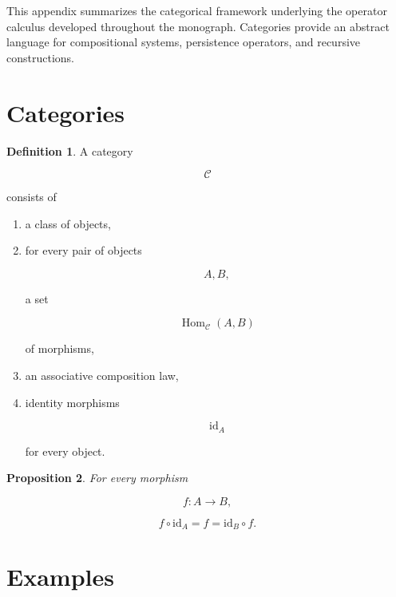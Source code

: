 \documentclass[11pt]{book}
\numberwithin{equation}{chapter}
\theoremstyle{definition}
\newtheorem{definition}{Definition}[chapter]
\theoremstyle{plain}
\newtheorem{proposition}[definition]{Proposition}
\begin{document}
This appendix summarizes the categorical framework underlying the
operator calculus developed throughout the monograph. Categories provide
an abstract language for compositional systems, persistence operators,
and recursive constructions.


\section{Categories}

\begin{definition}

A category

\[
\mathcal C
\]

consists of

\begin{enumerate}

\item
a class of objects,

\item
for every pair of objects

\[
A,B,
\]

a set

\[
\operatorname{Hom}_{\mathcal C}(A,B)
\]

of morphisms,

\item
an associative composition law,

\item
identity morphisms

\[
\mathrm{id}_A
\]

for every object.

\end{enumerate}

\end{definition}


\begin{proposition}

For every morphism

\[
f:A\rightarrow B,
\]

\[
f\circ\mathrm{id}_A
=
f
=
\mathrm{id}_B\circ f.
\]

\end{proposition}


\section{Examples}
\end{document}
